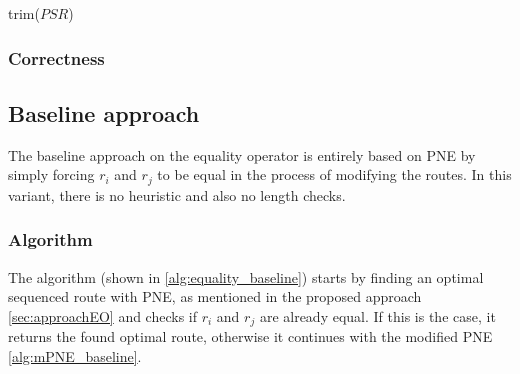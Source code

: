 \pagebreak

\begin{algorithm}[H]
	\label{alg:PNE}
	\caption{\protect\PNE \cite{OSR}}
\end{algorithm}

\begin{procedure}[H]
	\label{proc:trim}
	\caption{trim($PSR$)}
\end{procedure}

\subsubsection{Correctness}


\subsection{Baseline approach} 
\label{sec:baselineEO}
The baseline approach on the equality operator is entirely based on PNE by simply forcing $r_i$ and $r_j$ to be equal in the process of modifying the routes. In this variant, there is no heuristic and also no length checks.

\subsubsection{Algorithm}
The algorithm (shown in \ref{alg:equality_baseline}) starts by finding an optimal sequenced route with PNE, as mentioned in the proposed approach \ref{sec:approachEO} and checks if $r_i$ and $r_j$ are already equal. If this is the case, it returns the found optimal route, otherwise it continues with the modified PNE \ref{alg:mPNE_baseline}. 

